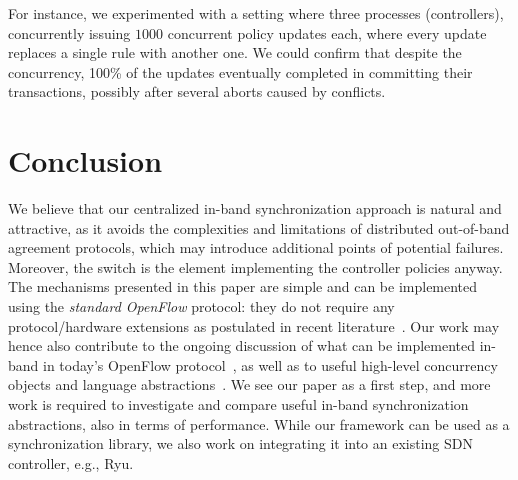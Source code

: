 \documentclass{sig-alternate-2006}
\newcommand{\petr}[1]{\textit{\textcolor{blue}{[petr]: #1}}} %
\begin{document}
For instance, we experimented with a setting where three processes
(controllers), concurrently issuing $1000$ concurrent policy updates
each, where every update replaces a single rule with another one.
We could confirm that 
despite the concurrency, 100\% of the updates 
eventually completed in committing their transactions, possibly after
several aborts caused by conflicts. 


\section{Conclusion}\label{sec:conclusion}


We believe that our centralized in-band
synchronization approach is natural and attractive, as it avoids the
complexities and limitations of distributed out-of-band agreement protocols, which may 
introduce additional points of potential failures.
Moreover, the switch is the element implementing the controller policies anyway.
The mechanisms presented in this paper are simple and can be implemented using the \emph{standard OpenFlow}
protocol: they do not require any protocol/hardware extensions as postulated in recent literature~\cite{infocom15,netpaxos}.
Our work may hence also contribute to the ongoing discussion of what can be implemented
in-band in today's OpenFlow protocol~\cite{reclaim},
as well as to useful high-level concurrency objects and
language abstractions~\cite{pyretic}.
We see our paper as a first step, and more
work is required to investigate and compare useful
in-band synchronization abstractions, also in terms of performance.
While our framework can be used as a synchronization library, we 
also work on integrating it into an existing SDN controller, e.g., Ryu. 


{
\begin{footnotesize}

\end{footnotesize}
}
\end{document}
